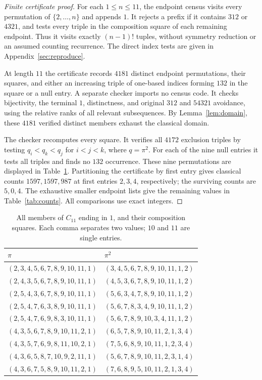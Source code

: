 \documentclass[11pt,a4paper]{article}
\begin{document}
\begin{proof}[Finite certificate proof]
For each $1\leq n\leq11$, the endpoint census visits every permutation
of $\{2,\ldots,n\}$ and appends $1$. It rejects a prefix if it contains
$312$ or $4321$, and tests every triple in the composition square of each
remaining endpoint. Thus it visits exactly $(n-1)!$ tuples, without
symmetry reduction or an assumed counting recurrence.
The direct index tests are given in Appendix~\ref{sec:reproduce}.

At length $11$ the certificate records $4181$ distinct endpoint permutations,
their squares, and either an increasing triple of one-based indices forming
$132$ in the square or a null entry. A separate checker imports no census
code. It checks bijectivity, the terminal $1$, distinctness, and original
$312$ and $54321$ avoidance, using the relative ranks of all relevant
subsequences. By Lemma~\ref{lem:domain}, these $4181$ verified distinct
members exhaust the classical domain.

The checker recomputes every square. It verifies all $4172$ exclusion triples
by testing $q_i<q_k<q_j$ for $i<j<k$, where $q=\pi^2$. For each of the nine
null entries it tests all triples and finds no $132$ occurrence. These nine
permutations are displayed in Table~\ref{tab:endpoints}.
Partitioning the certificate by first entry gives classical counts
$1597,1597,987$ at first entries $2,3,4$, respectively; the surviving counts
are $5,0,4$.
The exhaustive smaller endpoint lists give the remaining values in
Table~\ref{tab:counts}. All comparisons use exact integers.
\end{proof}

\begin{table}[tbp]
\centering\small
\caption{All members of $C_{11}$ ending in $1$, and their composition squares.
Each comma separates two values; $10$ and $11$ are single entries.}
\label{tab:endpoints}
\begin{tabular}{@{}ll@{}}
\toprule
$\pi$ & $\pi^2$ \\
\midrule
 $(2,3,4,5,6,7,8,9,10,11,1)$ & $(3,4,5,6,7,8,9,10,11,1,2)$ \\
 $(2,4,3,5,6,7,8,9,10,11,1)$ & $(4,5,3,6,7,8,9,10,11,1,2)$ \\
 $(2,5,4,3,6,7,8,9,10,11,1)$ & $(5,6,3,4,7,8,9,10,11,1,2)$ \\
 $(2,5,4,7,6,3,8,9,10,11,1)$ & $(5,6,7,8,3,4,9,10,11,1,2)$ \\
 $(2,5,4,7,6,9,8,3,10,11,1)$ & $(5,6,7,8,9,10,3,4,11,1,2)$ \\
 $(4,3,5,6,7,8,9,10,11,2,1)$ & $(6,5,7,8,9,10,11,2,1,3,4)$ \\
 $(4,3,5,7,6,9,8,11,10,2,1)$ & $(7,5,6,8,9,10,11,1,2,3,4)$ \\
 $(4,3,6,5,8,7,10,9,2,11,1)$ & $(5,6,7,8,9,10,11,2,3,1,4)$ \\
 $(4,3,6,7,5,8,9,10,11,2,1)$ & $(7,6,8,9,5,10,11,2,1,3,4)$ \\
\bottomrule
\end{tabular}
\end{table}
\end{document}
